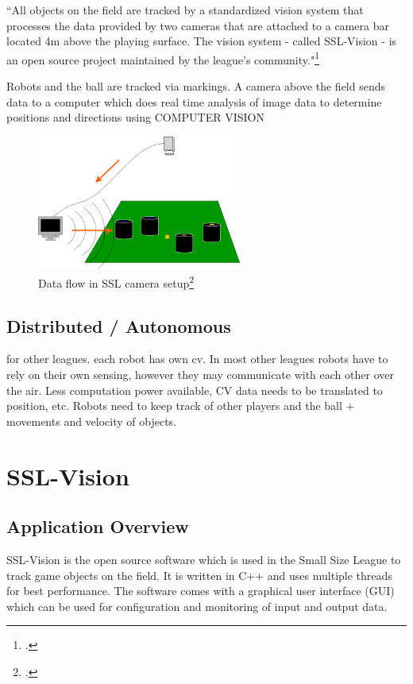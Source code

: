 ``All objects on the field are tracked by a standardized vision system that
processes the data provided by two cameras that are attached to a camera bar
located 4m above the playing surface. The vision system - called SSL-Vision - is
an open source project maintained by the league's community."\footcite[Cf.][]{robo_ssl_wiki}

Robots and the ball are tracked via markings. A camera above the field sends
data to a computer which does real time analysis of image data to determine
positions and directions using COMPUTER VISION

\begin{savenotes}
\begin{figure}[htbp]
\begin{center}
  \includegraphics[width=0.6\textwidth]{img/ssl_dataflow.png}
  \caption[Data flow in SSL camera setup]{Data flow in SSL camera setup\footcite[][]{robo_ssl_wiki}}
  \label{fig:ssl_dataflow}
\end{center}
\end{figure}
\end{savenotes}

\subsection{Distributed / Autonomous}
for other leagues. each robot has own cv.
In most other leagues robots have to rely on their own sensing, however they may
communicate with each other over the air.
Less computation power available, CV data needs to be translated to position,
etc. Robots need to keep track of other players and the ball + movements and
velocity of objects.



\newpage
\section{SSL-Vision \label{sec:ssl-vision}}


\subsection{Application Overview \label{sec:ssl-overview}}
SSL-Vision is the open source software which is used in the Small Size League to
track game objects on the field. It is written in C++ and uses multiple threads
for best performance. The software comes with a graphical user interface (GUI)
which can be used for configuration and monitoring of input and output data.

